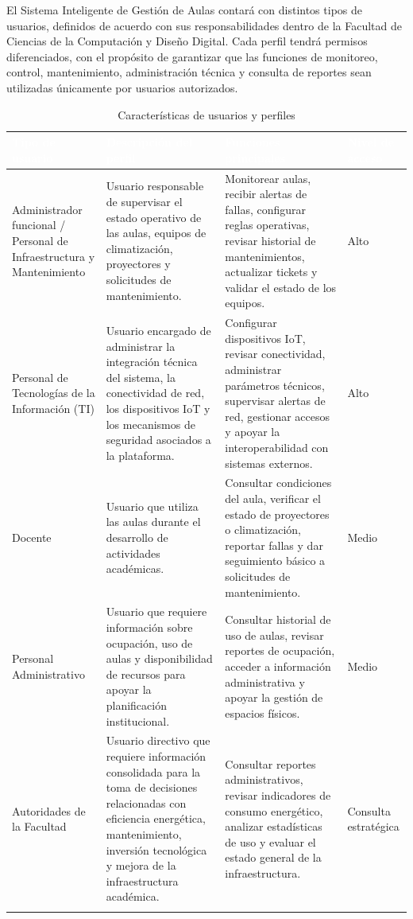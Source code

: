 
El Sistema Inteligente de Gestión de Aulas contará con distintos tipos de usuarios, definidos de acuerdo con sus responsabilidades dentro de la Facultad de Ciencias de la Computación y Diseño Digital. Cada perfil tendrá permisos diferenciados, con el propósito de garantizar que las funciones de monitoreo, control, mantenimiento, administración técnica y consulta de reportes sean utilizadas únicamente por usuarios autorizados.


\begingroup
\small
\begin{longtable}{|P{0.2500}|P{0.2500}|P{0.2500}|P{0.2500}|}
\hline
{}\textcolor{white}{\textbf{Tipo de usuario}} & \textcolor{white}{\textbf{Descripción del perfil}} & \textcolor{white}{\textbf{Funciones principales}} & \textcolor{white}{\textbf{Nivel de acceso}} \\ \hline
Administrador funcional / Personal de Infraestructura y Mantenimiento & Usuario responsable de supervisar el estado operativo de las aulas, equipos de climatización, proyectores y solicitudes de mantenimiento. & Monitorear aulas, recibir alertas de fallas, configurar reglas operativas, revisar historial de mantenimientos, actualizar tickets y validar el estado de los equipos. & Alto \\ \hline
Personal de Tecnologías de la Información (TI) & Usuario encargado de administrar la integración técnica del sistema, la conectividad de red, los dispositivos IoT y los mecanismos de seguridad asociados a la plataforma. & Configurar dispositivos IoT, revisar conectividad, administrar parámetros técnicos, supervisar alertas de red, gestionar accesos y apoyar la interoperabilidad con sistemas externos. & Alto \\ \hline
Docente & Usuario que utiliza las aulas durante el desarrollo de actividades académicas. & Consultar condiciones del aula, verificar el estado de proyectores o climatización, reportar fallas y dar seguimiento básico a solicitudes de mantenimiento. & Medio \\ \hline
Personal Administrativo & Usuario que requiere información sobre ocupación, uso de aulas y disponibilidad de recursos para apoyar la planificación institucional. & Consultar historial de uso de aulas, revisar reportes de ocupación, acceder a información administrativa y apoyar la gestión de espacios físicos. & Medio \\ \hline
Autoridades de la Facultad & Usuario directivo que requiere información consolidada para la toma de decisiones relacionadas con eficiencia energética, mantenimiento, inversión tecnológica y mejora de la infraestructura académica. & Consultar reportes administrativos, revisar indicadores de consumo energético, analizar estadísticas de uso y evaluar el estado general de la infraestructura. & Consulta estratégica \\ \hline
\caption{Características de usuarios y perfiles}
\end{longtable}
\endgroup

